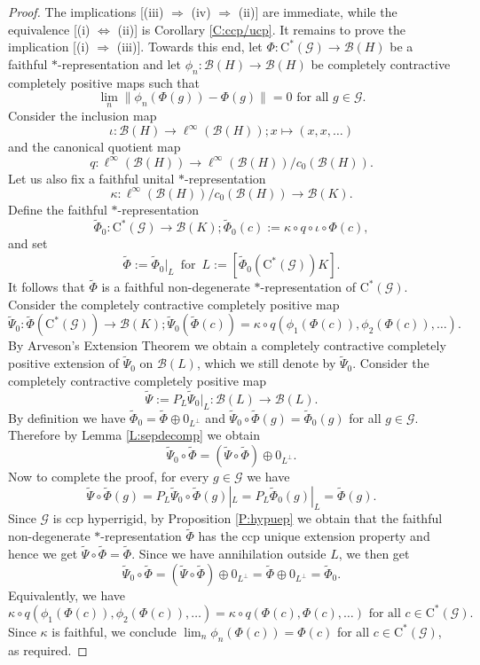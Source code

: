 \documentclass[11pt, draft]{amsart}
\numberwithin{equation}{section}
\theoremstyle{plain}
\theoremstyle{definition}
\theoremstyle{remark}
\newcommand{\B}{{\mathcal{B}}}
\newcommand{\G}{{\mathcal{G}}}
\def\io{\iota}
\def\ka{\kappa}
\newcommand{\foral}{\text{ for all }}
\newcommand{\ca}{\mathrm{C}^*}
\newcommand{\wt}{\widetilde}
\begin{document}
\begin{proof}
The implications [(iii) $\Rightarrow$ (iv) $\Rightarrow$ (ii)] are immediate, while the equivalence [(i) $\Leftrightarrow$ (ii)] is Corollary \ref{C:ccp/ucp}.
It remains to prove the implication [(i) $\Rightarrow$ (iii)]. 
Towards this end, let $\Phi \colon \ca(\G) \to \B(H)$ be a faithful $*$-representation and let $\phi_n \colon \B(H) \to \B(H)$ be completely contractive completely positive maps such that
\[
\lim_n \|\phi_n(\Phi(g)) - \Phi(g)\| = 0 \foral g \in \G.
\]
Consider the inclusion map
\[
\io \colon \B(H) \to \ell^{\infty}(\B(H)); x \mapsto (x, x, \dots)
\]
and the canonical quotient map
\[
q \colon \ell^{\infty}(\B(H)) \to \ell^\infty(\B(H))/c_0(\B(H)).
\]
Let us also fix a faithful unital $*$-representation
\[
\ka \colon \ell^\infty(\B(H))/c_0(\B(H)) \to \B(K).
\]
Define the faithful $*$-representation
\[
\wt{\Phi}_0 \colon \ca(\G) \to \B(K); \wt{\Phi}_0(c) := \ka \circ q \circ \io \circ \Phi(c),
\]
and set
\[
\wt{\Phi} := \wt{\Phi}_0 |_{L}
\, \text{ for } \,
L := [\wt{\Phi}_0(\ca(\G)) K].
\]
It follows that $\wt{\Phi}$ is a faithful non-degenerate $*$-representation of $\ca(\G)$.
Consider the completely contractive completely positive map
\[
\wt{\Psi}_0 \colon \wt{\Phi}(\ca(\G)) \to \B(K); \wt{\Psi}_0(\wt{\Phi}(c)) = \ka \circ q ( \phi_1(\Phi(c)), \phi_2(\Phi(c)), \dots ).
\]
By Arveson's Extension Theorem we obtain a completely contractive completely positive extension of $\wt{\Psi}_0$ on $\B(L)$, which we still denote by $\wt{\Psi}_0$.
Consider the completely contractive completely positive map
\[
\wt{\Psi} := P_{L} \wt{\Psi}_0 |_{L} \colon \B(L) \to \B(L).
\]
By definition we have $\wt{\Phi}_0 = \wt{\Phi} \oplus 0_{L^\perp}$ and $\wt{\Psi}_0 \circ \wt{\Phi}(g) = \wt{\Phi}_0(g)$ for all $g \in \G$.
Therefore by Lemma \ref{L:sepdecomp} we obtain
\[
\wt{\Psi}_0 \circ \wt{\Phi} 
=
(\wt{\Psi} \circ \wt{\Phi}) \oplus 0_{L^{\perp}}.
\]
Now to complete the proof, for every $g \in \G$ we have 
\[
\wt{\Psi} \circ \wt{\Phi}(g)
=
P_L \wt{\Psi}_0 \circ \wt{\Phi}(g) |_{L}
=
P_L \wt{\Phi}_0(g)|_{L}
=
\wt{\Phi}(g).
\]
Since $\G$ is ccp hyperrigid, by Proposition \ref{P:hypuep} we obtain that the faithful non-degenerate $*$-representation $\wt{\Phi}$ has the ccp unique extension property and hence we get $\wt{\Psi}\circ \wt{\Phi} = \wt{\Phi}$.
Since we have annihilation outside $L$, we then get
\[
\wt{\Psi}_0 \circ \wt{\Phi}
=
(\wt{\Psi} \circ \wt{\Phi}) \oplus 0_{L^\perp}
=
\wt{\Phi} \oplus 0_{L^\perp}
=
\wt{\Phi}_0.
\]
Equivalently, we have
\[
\ka \circ q(\phi_1(\Phi(c)), \phi_2(\Phi(c)), \dots)
=
\ka \circ q(\Phi(c), \Phi(c), \dots)
\foral 
c \in \ca(\G).
\]
Since $\ka$ is faithful, we conclude $\lim_n \phi_n(\Phi(c)) = \Phi(c)$ for all $c \in \ca(\G)$, as required.
\end{proof}
\end{document}

